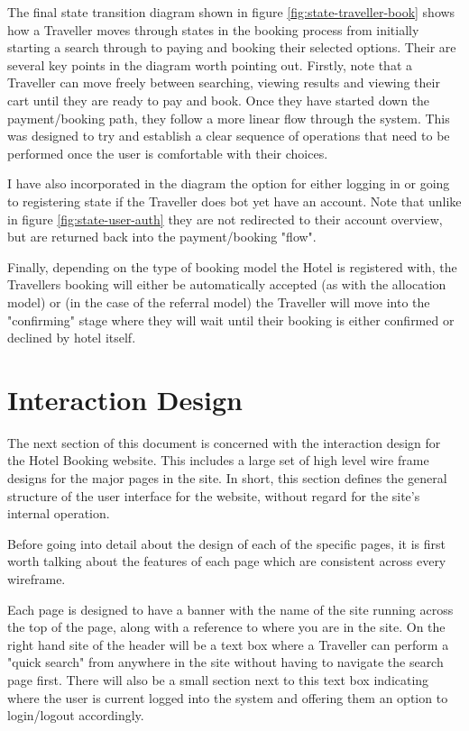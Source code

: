 \documentclass{article}
\begin{document}
The final state transition diagram shown in figure \ref{fig:state-traveller-book} shows how a Traveller moves through states in the booking process from initially starting a search through to paying and booking their selected options. Their are several key points in the diagram worth pointing out. Firstly, note that a Traveller can move freely between searching, viewing results and viewing their cart until they are ready to pay and book. Once they have started down the payment/booking path, they follow a more linear flow through the system. This was designed to try and establish a clear sequence of operations that need to be performed once the user is comfortable with their choices.

I have also incorporated in the diagram the option for either logging in or going to registering state if the Traveller does bot yet have an account. Note that unlike in figure \ref{fig:state-user-auth} they are not redirected to their account overview, but are returned back into the payment/booking "flow".

Finally, depending on the type of booking model the Hotel is registered with, the Travellers booking will either be automatically accepted (as with the allocation model) or  (in the case of the referral model) the Traveller will move into the "confirming" stage where they will wait until their booking is either confirmed or declined by hotel itself.

\section{Interaction Design}
The next section of this document is concerned with the interaction design for the  Hotel Booking website. This includes a large set of high level wire frame designs for the major pages in the site. In short, this section defines the general structure of the user interface for the website, without regard for the site's internal operation.

Before going into detail about the design of each of the specific pages, it is first worth talking about the features of each page which are consistent across every wireframe. 

Each page is designed to have a banner with the name of the site running across the top of the page, along with a reference to where you are in the site. On the right hand site of the header will be a text box where a Traveller can perform a "quick search" from anywhere in the site without having to navigate the search page first. There will also be a small section next to this text box indicating where the user is current logged into the system and offering them an option to login/logout accordingly.
\end{document}
